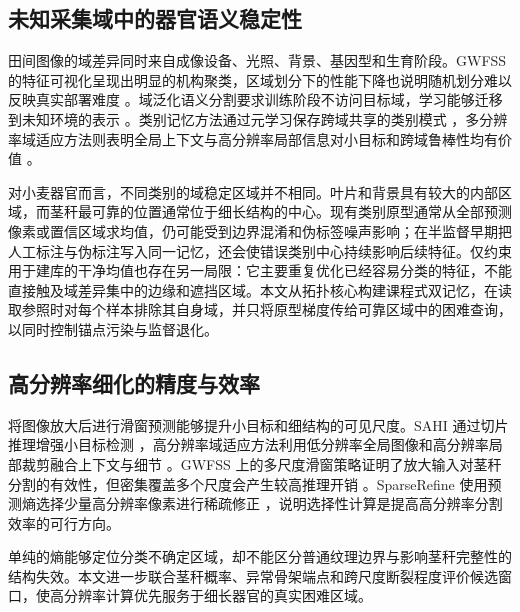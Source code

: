 \subsection{未知采集域中的器官语义稳定性}

田间图像的域差异同时来自成像设备、光照、背景、基因型和生育阶段。GWFSS 的特征可视化呈现出明显的机构聚类，区域划分下的性能下降也说明随机划分难以反映真实部署难度 \citep{wang2025gwfss}。域泛化语义分割要求训练阶段不访问目标域，学习能够迁移到未知环境的表示 \citep{schwonberg2025dgsurvey}。类别记忆方法通过元学习保存跨域共享的类别模式 \citep{kim2022pinmemory}，多分辨率域适应方法则表明全局上下文与高分辨率局部信息对小目标和跨域鲁棒性均有价值 \citep{hoyer2022hrda}。

对小麦器官而言，不同类别的域稳定区域并不相同。叶片和背景具有较大的内部区域，而茎秆最可靠的位置通常位于细长结构的中心。现有类别原型通常从全部预测像素或置信区域求均值，仍可能受到边界混淆和伪标签噪声影响；在半监督早期把人工标注与伪标注写入同一记忆，还会使错误类别中心持续影响后续特征。仅约束用于建库的干净均值也存在另一局限：它主要重复优化已经容易分类的特征，不能直接触及域差异集中的边缘和遮挡区域。本文从拓扑核心构建课程式双记忆，在读取参照时对每个样本排除其自身域，并只将原型梯度传给可靠区域中的困难查询，以同时控制锚点污染与监督退化。

\subsection{高分辨率细化的精度与效率}

将图像放大后进行滑窗预测能够提升小目标和细结构的可见尺度。SAHI 通过切片推理增强小目标检测 \citep{akyon2022sahi}，高分辨率域适应方法利用低分辨率全局图像和高分辨率局部裁剪融合上下文与细节 \citep{hoyer2022hrda}。GWFSS 上的多尺度滑窗策略证明了放大输入对茎秆分割的有效性，但密集覆盖多个尺度会产生较高推理开销 \citep{cao2025detailminority}。SparseRefine 使用预测熵选择少量高分辨率像素进行稀疏修正 \citep{liu2024sparserefine}，说明选择性计算是提高高分辨率分割效率的可行方向。

单纯的熵能够定位分类不确定区域，却不能区分普通纹理边界与影响茎秆完整性的结构失效。本文进一步联合茎秆概率、异常骨架端点和跨尺度断裂程度评价候选窗口，使高分辨率计算优先服务于细长器官的真实困难区域。
